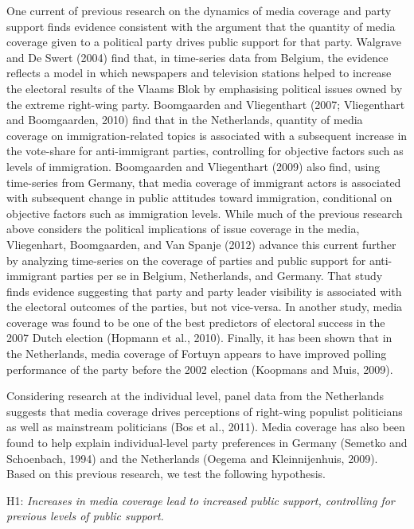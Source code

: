 \documentclass[12pt,article]{article}
\begin{document}
One current of previous research on the dynamics of media coverage and
party support finds evidence consistent with the argument that the
quantity of media coverage given to a political party drives public
support for that party. Walgrave and De Swert (2004) find that, in
time-series data from Belgium, the evidence reflects a model in which
newspapers and television stations helped to increase the electoral
results of the Vlaams Blok by emphasising political issues owned by the
extreme right-wing party. Boomgaarden and Vliegenthart (2007;
Vliegenthart and Boomgaarden, 2010) find that in the Netherlands,
quantity of media coverage on immigration-related topics is associated
with a subsequent increase in the vote-share for anti-immigrant parties,
controlling for objective factors such as levels of immigration.
Boomgaarden and Vliegenthart (2009) also find, using time-series from
Germany, that media coverage of immigrant actors is associated with
subsequent change in public attitudes toward immigration, conditional on
objective factors such as immigration levels. While much of the previous
research above considers the political implications of issue coverage in
the media, Vliegenhart, Boomgaarden, and Van Spanje (2012) advance this
current further by analyzing time-series on the coverage of parties and
public support for anti-immigrant parties per se in Belgium,
Netherlands, and Germany. That study finds evidence suggesting that
party and party leader visibility is associated with the electoral
outcomes of the parties, but not vice-versa. In another study, media
coverage was found to be one of the best predictors of electoral success
in the 2007 Dutch election (Hopmann et al., 2010). Finally, it has been
shown that in the Netherlands, media coverage of Fortuyn appears to have
improved polling performance of the party before the 2002 election
(Koopmans and Muis, 2009).

Considering research at the individual level, panel data from the
Netherlands suggests that media coverage drives perceptions of
right-wing populist politicians as well as mainstream politicians (Bos
et al., 2011). Media coverage has also been found to help explain
individual-level party preferences in Germany (Semetko and Schoenbach,
1994) and the Netherlands (Oegema and Kleinnijenhuis, 2009). Based on
this previous research, we test the following hypothesis.

H1: \emph{Increases in media coverage lead to increased public support,
controlling for previous levels of public support.}
\end{document}
